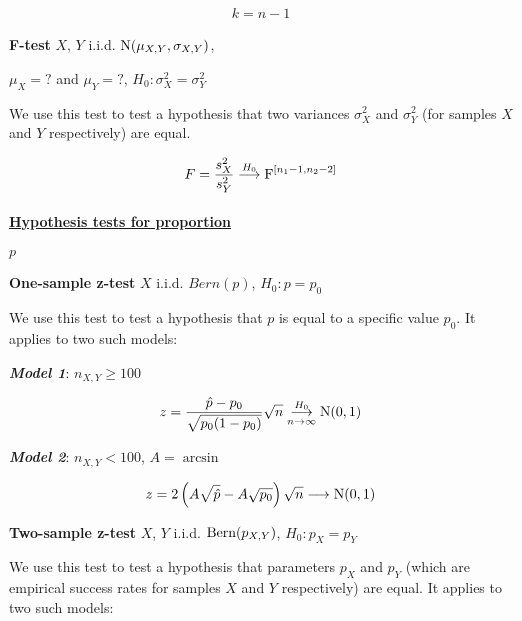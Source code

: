 \vspace{-15pt}
\begin{gather*}
k = n-1
\end{gather*}

\noindent \textbf{F-test}
$X$, $Y$ i.i.d. $\textrm{N}(\mu_{X,Y}, \sigma_{X,Y})$, 

$\mu_X=?$ and $\mu_Y=?$, $H_0: \sigma_X^2=\sigma_Y^2$

We use this test to test a hypothesis that two variances $\sigma_X^2$ and $\sigma_Y^2$ (for samples
$X$ and $Y$ respectively) are equal.

\vspace{-15pt}
\begin{gather*}
F = \frac{s_X^2}{s_Y^2} \overset{H_0}{\longrightarrow} \textrm{F}^{[n_1-1,n_2-2]}
\end{gather*}

\paragraph{\underline{Hypothesis tests for proportion}} $p$

\vspace{5pt}
\noindent \textbf{One-sample z-test}
$X$ i.i.d. $Bern(p)$, $H_0: p=p_0$

We use this test to test a hypothesis that $p$ is equal to a specific value $p_0$. It applies to two
such models:

\vspace{10pt}
\textbf{\em Model 1}:
$n_{X,Y}\geq100$

\vspace{-15pt}
\begin{gather*}
z=\frac{\hat{p}-p_0}{\sqrt{p_0(1-p_0)}}\sqrt{n}
\overset{H_0}{\underset{n \rightarrow \infty}{\longrightarrow}} \textrm{N}(0,1)
\end{gather*}

\textbf{\em Model 2}:
$n_{X,Y}<100$, $A = \arcsin$

\vspace{-15pt}
\begin{gather*}
z=2\left(A{\sqrt{\hat{p}}}-A{\sqrt{p_0}} \right)\sqrt{n}
\longrightarrow \textrm{N}(0,1)
\end{gather*}

\noindent \textbf{Two-sample z-test}
$X$, $Y$ i.i.d. $\textrm{Bern}(p_{X,Y})$, $H_0: p_X=p_Y$

We use this test to test a hypothesis that parameters $p_X$ and $p_Y$ (which are empirical success
rates for samples $X$ and $Y$ respectively) are equal. It applies to two such models:

